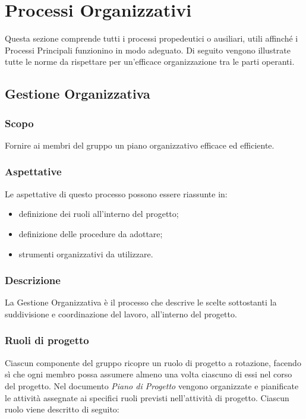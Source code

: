 \section{Processi Organizzativi}
	Questa sezione comprende tutti i processi propedeutici o ausiliari, utili affinché i Processi Principali funzionino in modo adeguato. Di seguito vengono illustrate tutte le norme da rispettare per un'efficace organizzazione tra le parti operanti.

	\subsection{Gestione Organizzativa}
	
		\subsubsection{Scopo}
			 Fornire ai membri del gruppo un piano organizzativo efficace ed efficiente.
			 
		\subsubsection{Aspettative}
			Le aspettative di questo processo possono essere riassunte in:
			\begin{itemize}
				\item definizione dei ruoli all'interno del progetto;
				\item definizione delle procedure da adottare;
				\item strumenti organizzativi da utilizzare.
			\end{itemize}
		
		\subsubsection{Descrizione}
			La Gestione Organizzativa è il processo che descrive le scelte sottostanti la suddivisione e coordinazione del lavoro, all'interno del progetto.
			
		
		\subsubsection{Ruoli di progetto}
			Ciascun componente del gruppo ricopre un ruolo di progetto a rotazione, facendo sì che ogni membro possa assumere almeno una volta ciascuno di essi nel corso del progetto. Nel documento {\it Piano di Progetto} vengono organizzate e pianificate le attività assegnate ai specifici ruoli previsti nell'attività di progetto. Ciascun ruolo viene descritto di seguito:
			
